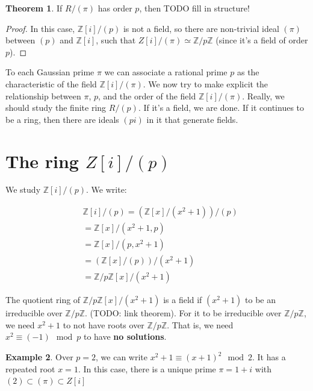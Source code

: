 \documentclass{book}
\newcommand{\Z}{\ensuremath{\mathbb{Z}}}
\theoremstyle{definition}
\newtheorem{theorem}{Theorem}
\newtheorem{example}[theorem]{Example}
\begin{document}
\begin{theorem}
If $R/(\pi)$ has order $p$, then TODO fill in structure!
\end{theorem}
\begin{proof}
In this case, $\Z[i]/(p)$ is not a field, so there are non-trivial ideal $(\pi)$
between $(p)$ and $\Z[i]$, such that $Z[i]/(\pi) \simeq \Z/p\Z$ (since it's a field of order $p$).
\end{proof}

To each Gaussian prime $\pi$ we can associate a rational prime $p$ as the
characteristic of the field $\Z[i]/(\pi)$. We now try to make explicit
the relationship between $\pi$, $p$, and the order of the field $\Z[i]/(\pi)$.
Really, we should study the finite ring $R/(p)$. If it's a field, we are
done. If it continues to be a ring, then there are ideals $(pi)$ in it
that generate fields.

\section{The ring $Z[i]/(p)$}

We study $\Z[i]/(p)$. We write:

\begin{align*}
&\Z[i]/(p) = (\Z[x] / (x^2+1)) / (p) \\
& = \Z[x] / (x^2+1, p) \\
& = \Z[x] / (p, x^2+1)  \\
& = (\Z[x] / (p)) / (x^2+1) \\
& = \Z/p\Z[x] / (x^2+1)
\end{align*}

The quotient ring of $\Z/p\Z[x] / (x^2+1)$ is a field if $(x^2+1)$
to be an irreducible over $\Z/p\Z$.
(TODO: link theorem). For it to be irreducible over $\Z/p\Z$, we need $x^2+1$ to not have roots
over $\Z/p\Z$. That is, we need $x^2 \equiv (-1) \mod p$ to have \textbf{no solutions}.

\begin{example}
Over $p=2$, we can write $x^2+1 \equiv (x+1)^2 \mod 2$. It has a repeated root $x = 1$.
In this case, there is a unique prime $\pi = 1 + i$ with
$(2) \subset (\pi) \subset Z[i]$
\end{example}
\end{document}
